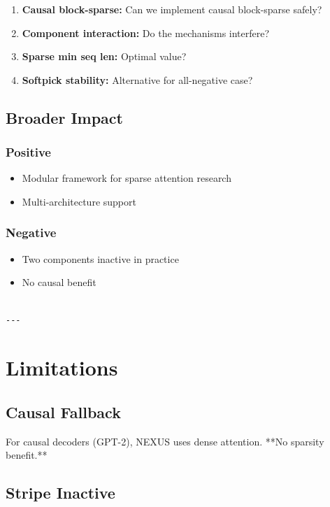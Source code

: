 \begin{enumerate}
\item \textbf{Causal block-sparse:} Can we implement causal block-sparse safely?
\item \textbf{Component interaction:} Do the mechanisms interfere?
\item \textbf{Sparse min seq len:} Optimal value?
\item \textbf{Softpick stability:} Alternative for all-negative case?

\end{enumerate}
\subsection{Broader Impact}

\subsubsection{Positive}
\begin{itemize}
\item Modular framework for sparse attention research
\item Multi-architecture support

\end{itemize}
\subsubsection{Negative}
\begin{itemize}
\item Two components inactive in practice
\item No causal benefit
\end{itemize}
\begin{lstlisting}

---
\end{lstlisting}

\section{Limitations}

\subsection{Causal Fallback}

For causal decoders (GPT-2), NEXUS uses dense attention. **No sparsity 
benefit.**

\subsection{Stripe Inactive}

